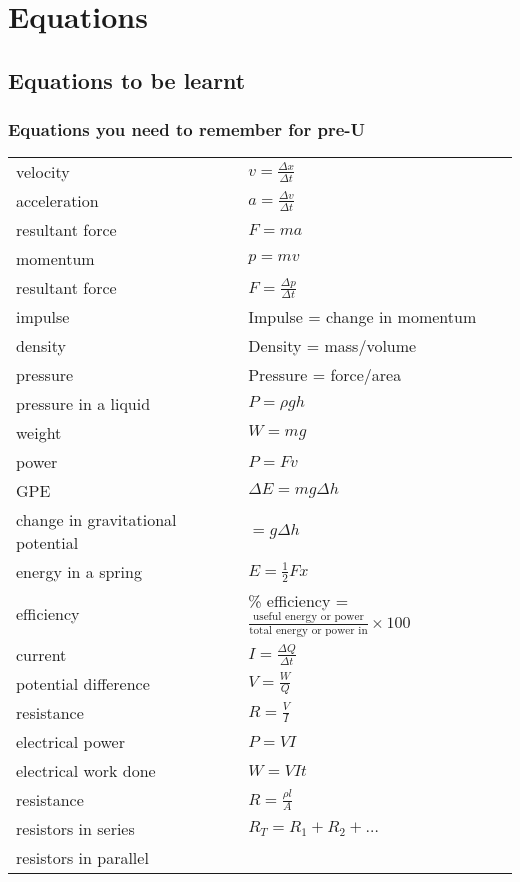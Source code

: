 \documentclass[main.tex]{subfiles}
\begin{document}
\chapter{Equations}
\setlength{\LTleft}{0pt}

\section{Equations to be learnt}
\subsection{Equations you need to remember for pre-U}

\renewcommand*{\arraystretch}{2}
\begin{longtable}{ll}
velocity & $v= \frac{\Delta x}{\Delta t}$ \\
acceleration & $a= \frac{\Delta v}{\Delta t}$ \\
resultant force & $F=ma$ \\
momentum & $p=mv$ \\
resultant force & $F=\frac{\Delta p}{\Delta t}$ \\
impulse & Impulse = change in momentum \\
density & Density = mass/volume \\
pressure & Pressure = force/area \\
pressure in a liquid & $P = \rho gh$ \\
weight & $W = mg$ \\
power & $P = Fv$ \\
GPE & $\Delta E = mg \Delta h$ \\
change in gravitational potential & $=g \Delta h $ \\
energy in a spring & $E = \frac{1}{2} Fx$ \\
efficiency & \% efficiency =
$\frac{\text{useful energy or power}}{\text{total energy or power in}}
\times 100$ \\
current & $I = \frac{\Delta Q}{\Delta t}$ \\
potential difference & $V = \frac{W}{Q}$ \\
resistance & $R = \frac{V}{I}$ \\
electrical power & $P = VI$ \\
electrical work done & $W = VIt$\\
resistance & $R = \frac{\rho l}{A}$ \\
resistors in series & $R_T = R_1 + R_2 + \ldots{}$\\
resistors in parallel &

\end{longtable}
\end{document}
